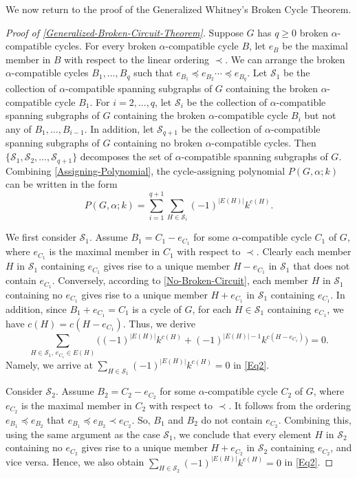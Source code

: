\documentclass[12pt]{article}%
\numberwithin{equation}{section}
\begin{document}
We now return to the proof of the Generalized Whitney's Broken Cycle Theorem.
\begin{proof}[Proof of \autoref{Generalized-Broken-Circuit-Theorem}]
Suppose $G$ has $q\ge 0$  broken $\alpha$-compatible cycles. For every  broken $\alpha$-compatible cycle $B$, let $e_B$ be the maximal member in $B$ with respect to the linear ordering $\prec$. We can arrange the  broken $\alpha$-compatible cycles $B_1,\ldots, B_q$ such that $e_{B_1}\preceq e_{B_2}\cdots\preceq  e_{B_q}$. Let $\mathcal{S}_1$ be the collection of $\alpha$-compatible spanning subgraphs of $G$ containing the  broken $\alpha$-compatible cycle $B_1$. For $i=2,\ldots,q$, let $\mathcal{S}_i$ be the collection of $\alpha$-compatible spanning subgraphs of $G$  containing the  broken $\alpha$-compatible cycle $B_i$ but not any of $B_1,\ldots, B_{i-1}$. In addition, let $\mathcal{S}_{q+1}$ be the collection of $\alpha$-compatible spanning subgraphs of $G$ containing no  broken $\alpha$-compatible cycles. Then $\{\mathcal{S}_1,\mathcal{S}_2,\ldots,\mathcal{S}_{q+1}\}$ decomposes the set of $\alpha$-compatible spanning subgraphs of $G$. Combining \autoref{Assigning-Polynomial}, the cycle-assigning polynomial $P(G,\alpha;k)$ can be written in the form
\begin{equation}\label{Eq2}
P(G,\alpha;k)=\sum_{i=1}^{q+1}\sum_{H\in\mathcal{S}_i}(-1)^{|E(H)|}k^{c(H)}.
\end{equation}

We first consider $\mathcal{S}_1$. Assume $B_1=C_1-e_{C_1}$ for some $\alpha$-compatible cycle $C_1$ of $G$, where $e_{C_1}$ is the maximal member in $C_1$ with respect to $\prec$. Clearly each member $H$ in $\mathcal{S}_1$ containing $e_{C_1}$  gives rise to a unique member $H-e_{C_1}$ in $\mathcal{S}_1$ that does not contain $e_{C_1}$. Conversely, according to \autoref{No-Broken-Circuit}, each member $H$ in $\mathcal{S}_1$ containing no $e_{C_1}$ gives rise to a unique member $H+e_{C_1}$ in $\mathcal{S}_1$ containing $e_{C_1}$. In addition, since $B_1+e_{C_1}=C_1$ is a cycle of $G$, for each $H\in\mathcal{S}_1$ containing $e_{C_1}$, we have $c(H)=c(H- e_{C_1})$. Thus, we derive
\[
\sum_{H\in\mathcal{S}_1,\, e_{C_1}\in E(H)}\big((-1)^{|E(H)|}k^{c(H)}+(-1)^{|E(H)|-1}k^{c(H-e_{C_1})}\big)=0.
\]
Namely, we arrive at $\sum_{H\in\mathcal{S}_1}(-1)^{|E(H)|}k^{c(H)}=0$ in \eqref{Eq2}.

Consider $\mathcal{S}_2$. Assume $B_2=C_2-e_{C_2}$ for some $\alpha$-compatible cycle $C_2$ of $G$, where $e_{C_2}$ is the maximal member in $C_2$ with respect to $\prec$. It follows from the ordering $e_{B_1}\preceq e_{B_2}$ that  $e_{B_1}\preceq e_{B_2}\prec e_{C_2}$. So, $B_1$ and $B_2$ do not contain $e_{C_2}$. Combining this, using the same argument as the case $\mathcal{S}_1$, we conclude that every element $H$ in $\mathcal{S}_2$ containing no $e_{C_2}$ gives rise to a unique member $H+e_{C_2}$ in $\mathcal{S}_2$ containing $e_{C_2}$, and vice versa. Hence, we also obtain $\sum_{H\in\mathcal{S}_2}(-1)^{|E(H)|}k^{c(H)}=0$ in \eqref{Eq2}.


\end{proof}
\end{document}
